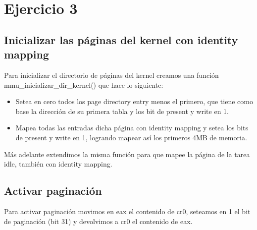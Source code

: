\section{Ejercicio 3}

\subsection{Inicializar las páginas del kernel con identity mapping}

Para inicializar el directorio de páginas del kernel creamos una función mmu_inicializar_dir_kernel() que hace lo siguiente:

\begin{itemize}
	\item Setea en cero todos los page directory entry menos el primero, que tiene como base la dirección de su primera tabla y los bit de present y write en 1.
	\item Mapea todas las entradas dicha página con identity mapping y setea los bits de present y write en 1, logrando mapear así los primeros 4MB de memoria.
\end{itemize}

Más adelante extendimos la misma función para que mapee la página de la tarea idle, también con identity mapping.

\subsection{Activar paginación}

Para activar paginación movimos en eax el contenido de cr0, seteamos en 1 el bit de paginación (bit 31) y devolvimos a cr0 el contenido de eax.
